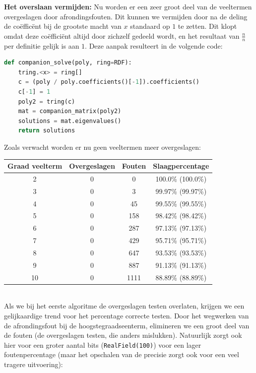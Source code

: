 \documentclass{article}
\begin{document}
\textbf{Het overslaan vermijden:} Nu worden er een zeer groot deel van de veeltermen overgeslagen door afrondingsfouten. Dit kunnen we vermijden door na de deling de co\"effic\"ent bij de grootste macht van \(x\) standaard op \(1\) te zetten. Dit klopt omdat deze co\"effici\"ent altijd door zichzelf gedeeld wordt, en het resultaat van \(\frac{n}{n}\) per definitie gelijk is aan \(1\). Deze aanpak resulteert in de volgende code:
\begin{lstlisting}[language=Python]
def companion_solve(poly, ring=RDF):
    tring.<x> = ring[]
    c = (poly / poly.coefficients()[-1]).coefficients()
    c[-1] = 1
    poly2 = tring(c)
    mat = companion_matrix(poly2)
    solutions = mat.eigenvalues()
    return solutions
\end{lstlisting}
Zoals verwacht worden er nu geen veeltermen meer overgeslagen:\\
\begin{tabular}{|c|c|c|c|}
 \hline
 \textbf{Graad veelterm} & \textbf{Overgeslagen} & \textbf{Fouten} & \textbf{Slaagpercentage} \\
 \hline
 2  & 0 & 0    & 100.0\% (100.0\%) \\
 3  & 0 & 3    & 99.97\% (99.97\%) \\
 4  & 0 & 45   & 99.55\% (99.55\%) \\
 5  & 0 & 158  & 98.42\% (98.42\%) \\
 6  & 0 & 287  & 97.13\% (97.13\%) \\
 7  & 0 & 429  & 95.71\% (95.71\%) \\
 8  & 0 & 647  & 93.53\% (93.53\%) \\
 9  & 0 & 887  & 91.13\% (91.13\%) \\
 10 & 0 & 1111 & 88.89\% (88.89\%) \\
 \hline
\end{tabular} \\
Als we bij het eerste algoritme de overgeslagen testen overlaten, krijgen we een gelijkaardige trend voor het percentage correcte testen. Door het wegwerken van de afrondingsfout bij de hoogstegraadseenterm, elimineren we een groot deel van de fouten (de overgeslagen testen, die anders mislukken). Natuurlijk zorgt ook hier voor een groter aantal bits (\verb|RealField(100)|) voor een lager foutenpercentage (maar het opschalen van de precisie zorgt ook voor een veel tragere uitvoering):\\
\end{document}
